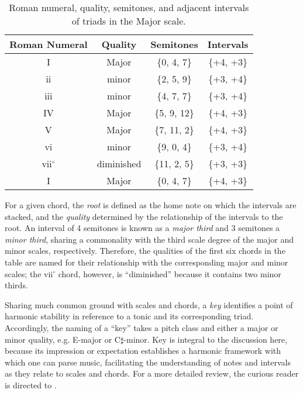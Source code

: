 \begin{table}[h!]
\begin{center}
\caption{Roman numeral, quality, semitones, and adjacent intervals of triads in the Major scale.}
\label{tab:major_triads}
\begin{tabular}{c | c | c | c }
Roman Numeral & Quality & Semitones & Intervals \\
\hline
I & Major & \{0, 4, 7\} & \{+4, +3\}\\
ii & minor & \{2, 5, 9\} & \{+3, +4\}\\
iii & minor & \{4, 7, 7\} & \{+3, +4\}\\
IV & Major & \{5, 9, 12\} & \{+4, +3\}\\
V & Major & \{7, 11, 2\} & \{+4, +3\}\\
vi & minor & \{9, 0, 4\} & \{+3, +4\}\\
vii$^\circ$ & diminished & \{11, 2, 5\} & \{+3, +3\}\\
I & Major & \{0, 4, 7\} & \{+4, +3\}\\
\hline
\end{tabular}
\end{center}
\end{table}

For a given chord, the \emph{root} is defined as the home note on which the intervals are stacked, and the \emph{quality} determined by the relationship of the intervals to the root.
An interval of 4 semitones is known as a \emph{major third} and 3 semitones a \emph{minor third}, sharing a commonality with the third scale degree of the major and minor scales, respectively.
Therefore, the qualities of the first six chords in the table are named for their relationship with the corresponding major and minor scales; the vii$^\circ$ chord, however, is ``diminished'' because it contains two minor thirds.

Sharing much common ground with scales and chords, a \emph{key} identifies a point of harmonic stability in reference to a tonic and its corresponding triad.
Accordingly, the naming of a ``key'' takes a pitch class and either a major or minor quality, e.g. E-major or C$\sharp$-minor.
Key is integral to the discussion here, because its impression or expectation establishes a harmonic framework with which one can parse music, facilitating the understanding of notes and intervals as they relate to scales and chords.
For a more detailed review, the curious reader is directed to \cite{Laitz2009Graduate}.


